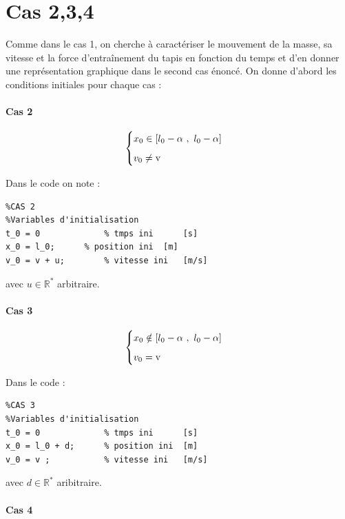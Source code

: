 \documentclass{article}
\begin{document}
\newpage

\section{Cas 2,3,4}
Comme dans le cas 1, on cherche à caractériser le mouvement de la masse, sa vitesse et la force d'entraînement du tapis en fonction du temps et d'en donner une représentation graphique dans le second cas énoncé. On donne d'abord les conditions initiales pour chaque cas :

\paragraph{Cas 2}
 
$$
\begin{cases}
	\vspace{.2cm}
	x_0 \in [l_0-\alpha~,~l_0-\alpha]\\
	v_0\neq \text{v}
\end{cases}
$$

Dans le code on note :

\begin{lstlisting}
%CAS 2
%Variables d'initialisation
t_0 = 0 			% tmps ini		[s]
x_0 = l_0; 		% position ini	[m]
v_0 = v + u;		% vitesse ini	[m/s]     
\end{lstlisting}

avec $u\in \mathbb{R}^*$ arbitraire.

\paragraph{Cas 3}

$$
\begin{cases}
	\vspace{.2cm}
	x_0 \notin [l_0-\alpha~,~l_0-\alpha]\\
	v_0= \text{v}
\end{cases}
$$

Dans le code :

\begin{lstlisting}
%CAS 3
%Variables d'initialisation
t_0 = 0				% tmps ini		[s]
x_0 = l_0 + d;		% position ini	[m]
v_0 = v ;			% vitesse ini	[m/s]       
\end{lstlisting}

avec $d\in \mathbb{R}^*$ aribitraire.

\paragraph{Cas 4}
\end{document}
